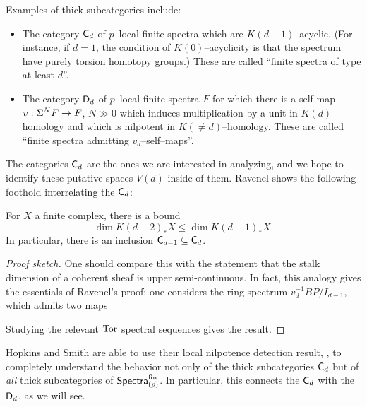 \noindent Examples of thick subcategories include:
\begin{itemize}
\item The category $\mathsf{C}_d$ of $p$--local finite spectra which are $K(d-1)$--acyclic.  (For instance, if $d = 1$, the condition of $K(0)$--acyclicity is that the spectrum have purely torsion homotopy groups.)  These are called ``finite spectra of type at least $d$''.
\item The category $\mathsf{D}_d$ of $p$--local finite spectra $F$ for which there is a self-map $v: \Sigma^N F \to F$, $N \gg 0$ which induces multiplication by a unit in $K(d)$--homology and which is nilpotent in $K(\ne d)$--homology.  These are called ``finite spectra admitting $v_d$--self--maps''.
\end{itemize}

\noindent The categories $\mathsf{C}_d$ are the ones we are interested in analyzing, and we hope to identify these putative spaces $V(d)$ inside of them.  Ravenel shows the following foothold interrelating the $\mathsf{C}_d$:

\begin{lemma}\label{CdCategoriesNest}
For $X$ a finite complex, there is a bound \[\dim K(d-2)_* X \le \dim K(d-1)_* X.\]  In particular, there is an inclusion $\mathsf{C}_{d-1} \subseteq \mathsf{C}_d$.
\end{lemma}
\begin{proof}[Proof sketch]
One should compare this with the statement that the stalk dimension of a coherent sheaf is upper semi-continuous.  In fact, this analogy gives the essentials of Ravenel's proof: one considers the ring spectrum $v_d^{-1} BP / I_{d-1}$, which admits two maps
\begin{center}
\end{center}
Studying the relevant $\operatorname{Tor}$ spectral sequences gives the result.
\end{proof}

Hopkins and Smith are able to use their local nilpotence detection result, , to completely understand the behavior not only of the thick subcategories $\mathsf{C}_d$ but of \emph{all} thick subcategories of $\mathsf{Spectra}_{(p)}^{\mathrm{fin}}$.  In particular, this connects the $\mathsf{C}_d$ with the $\mathsf{D}_d$, as we will see.

